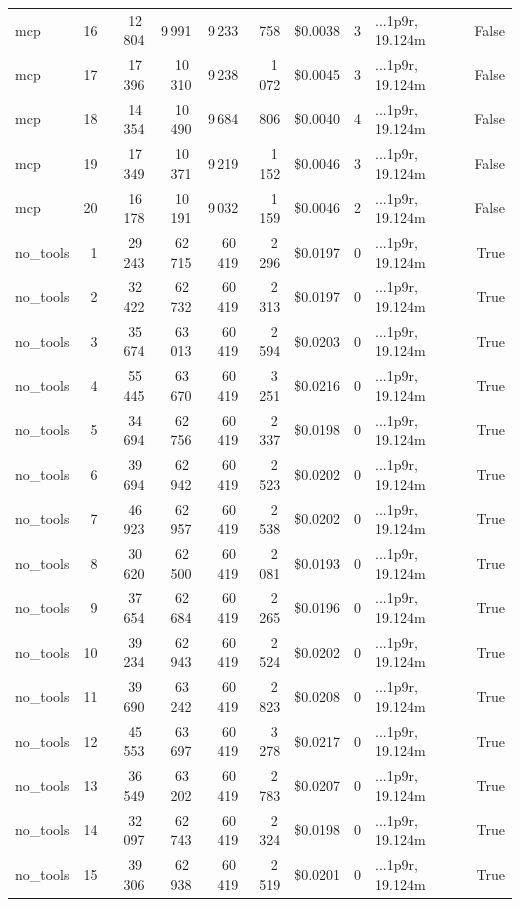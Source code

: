 \documentclass[a4paper,11pt]{article}
\begin{document}
\begin{table}[H]
{\begin{tabular}{l r r r r r r r l r}
mcp & 16 & 12\,804 & 9\,991 & 9\,233 & 758 & \$0.0038 & 3 & ...1p9r, 19.124m & False \\
mcp & 17 & 17\,396 & 10\,310 & 9\,238 & 1\,072 & \$0.0045 & 3 & ...1p9r, 19.124m & False \\
mcp & 18 & 14\,354 & 10\,490 & 9\,684 & 806 & \$0.0040 & 4 & ...1p9r, 19.124m & False \\
mcp & 19 & 17\,349 & 10\,371 & 9\,219 & 1\,152 & \$0.0046 & 3 & ...1p9r, 19.124m & False \\
mcp & 20 & 16\,178 & 10\,191 & 9\,032 & 1\,159 & \$0.0046 & 2 & ...1p9r, 19.124m & False \\
\midrule
no\_tools & 1 & 29\,243 & 62\,715 & 60\,419 & 2\,296 & \$0.0197 & 0 & ...1p9r, 19.124m & True \\
no\_tools & 2 & 32\,422 & 62\,732 & 60\,419 & 2\,313 & \$0.0197 & 0 & ...1p9r, 19.124m & True \\
no\_tools & 3 & 35\,674 & 63\,013 & 60\,419 & 2\,594 & \$0.0203 & 0 & ...1p9r, 19.124m & True \\
no\_tools & 4 & 55\,445 & 63\,670 & 60\,419 & 3\,251 & \$0.0216 & 0 & ...1p9r, 19.124m & True \\
no\_tools & 5 & 34\,694 & 62\,756 & 60\,419 & 2\,337 & \$0.0198 & 0 & ...1p9r, 19.124m & True \\
no\_tools & 6 & 39\,694 & 62\,942 & 60\,419 & 2\,523 & \$0.0202 & 0 & ...1p9r, 19.124m & True \\
no\_tools & 7 & 46\,923 & 62\,957 & 60\,419 & 2\,538 & \$0.0202 & 0 & ...1p9r, 19.124m & True \\
no\_tools & 8 & 30\,620 & 62\,500 & 60\,419 & 2\,081 & \$0.0193 & 0 & ...1p9r, 19.124m & True \\
no\_tools & 9 & 37\,654 & 62\,684 & 60\,419 & 2\,265 & \$0.0196 & 0 & ...1p9r, 19.124m & True \\
no\_tools & 10 & 39\,234 & 62\,943 & 60\,419 & 2\,524 & \$0.0202 & 0 & ...1p9r, 19.124m & True \\
no\_tools & 11 & 39\,690 & 63\,242 & 60\,419 & 2\,823 & \$0.0208 & 0 & ...1p9r, 19.124m & True \\
no\_tools & 12 & 45\,553 & 63\,697 & 60\,419 & 3\,278 & \$0.0217 & 0 & ...1p9r, 19.124m & True \\
no\_tools & 13 & 36\,549 & 63\,202 & 60\,419 & 2\,783 & \$0.0207 & 0 & ...1p9r, 19.124m & True \\
no\_tools & 14 & 32\,097 & 62\,743 & 60\,419 & 2\,324 & \$0.0198 & 0 & ...1p9r, 19.124m & True \\
no\_tools & 15 & 39\,306 & 62\,938 & 60\,419 & 2\,519 & \$0.0201 & 0 & ...1p9r, 19.124m & True \\

\end{tabular}}
\end{table}
\end{document}
